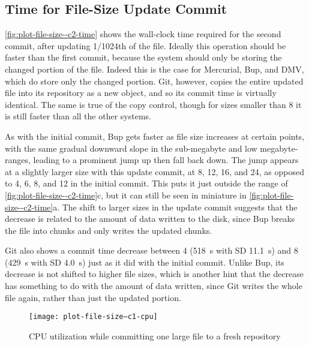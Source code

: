 \cleardoublepage

\subsection{Time for File-Size Update Commit}
\label{results-file-size--c2-time}

\autoref{fig:plot-file-size--c2-time} shows the wall-clock time required for the
second \gls{commit}, after updating \num{1/1024}th of the file. Ideally this
operation should be faster than the first \gls{commit}, because the system
should only be storing the changed portion of the file. Indeed this is the case
for Mercurial, Bup, and \gls{DMV}, which do store only the changed portion. Git,
however, copies the entire updated file into its repository as a new object, and
so its \gls{commit} time is virtually identical. The same is true of the copy
control, though for sizes smaller than \SI{8}{\gib} it is still faster than all
the other systems.

As with the initial commit, Bup gets faster as file size increases at certain
points, with the same gradual downward slope in the sub-megabyte and low
megabyte-ranges, leading to a prominent jump up then fall back down. The jump
appears at a slightly larger size with this update commit, at \num{8}, \num{12},
\num{16}, and \SI{24}{\mib}, as opposed to \num{4}, \num{6}, \num{8}, and
\SI{12}{\mib} in the initial commit. This puts it just outside the range of
\autoref{fig:plot-file-size--c2-time}c, but it can still be seen in miniature in
\autoref{fig:plot-file-size--c2-time}a. The shift to larger sizes in the update
commit suggests that the decrease is related to the amount of data written to
the disk, since Bup breaks the file into chunks and only writes the updated
chunks.

Git also shows a commit time decrease between \SI{4}{\gib} (\SI{518}{\s} with SD
\SI{11.1}{\s}) and \SI{8}{\gib} (\SI{429}{\s} with SD \SI{4.0}{\s}) just as it
did with the initial commit. Unlike Bup, its decrease is not shifted to higher
file sizes, which is another hint that the decrease has something to do with the
amount of data written, since Git writes the whole file again, rather than just
the updated portion.

%


\begin{figure}[p]
    \caption{CPU utilization while committing one large file to a fresh repository}
    \label{fig:plot-file-size--c1-cpu}
    \centering
    \texttt{[image: plot-file-size--c1-cpu]}
\end{figure}

